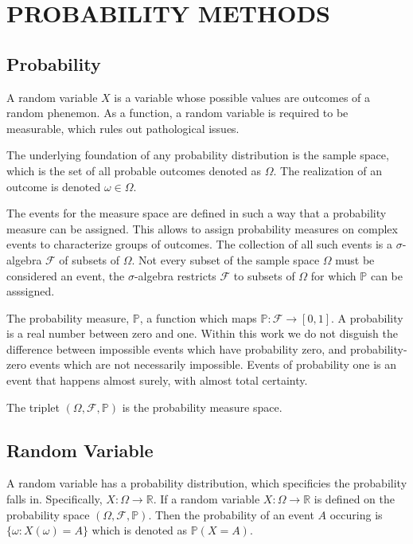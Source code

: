 \chapter{PROBABILITY METHODS} \label{materials}

\section{Probability}
A random variable $X$ is a variable whose possible values are outcomes of a random phenemon.  As a function, a random variable is required to be measurable, which rules out pathological issues.

The underlying foundation of any probability  distribution is the sample space, which is the set of all probable outcomes denoted as $\Omega$.  The realization of an outcome is denoted $\omega \in \Omega$.

The events for the measure space are defined in such a way that a probability measure can be assigned.  This allows to assign probability measures on complex events to characterize groups of outcomes.  The collection of all such events is a $\sigma$-algebra $\mathcal{F}$ of subsets of $\Omega$.  Not every subset of the sample space $\Omega$ must be considered an event, the $\sigma$-algebra restricts $\mathcal{F}$ to subsets of $\Omega$ for which $\mathbb{P}$ can be asssigned.

The probability measure, $\mathbb{P}$, a function which maps $\mathbb{P}:\mathcal{F}\rightarrow[0,1]$.  A probability is a real number between zero and one.  Within this work we do not disguish the difference between impossible events which have probability zero, and probability-zero events which are not necessarily impossible.  Events of probability one is an event that happens almost surely, with almost total certainty.

The triplet $(\Omega,\mathcal{F},\mathbb{P})$ is the probability measure space.

\section{Random Variable}
A random variable has a probability distribution, which specificies the probability falls in.  Specifically, $X:\Omega\rightarrow\mathbb{R}$.  If a random variable $X:\Omega \rightarrow \mathbb{R}$ is defined on the probability space $(\Omega,\mathcal{F},\mathbb{P})$.  Then the probability of an event $A$ occuring is $\{\omega:X(\omega)=A\}$ which is denoted as $\mathbb{P}(X=A)$.

